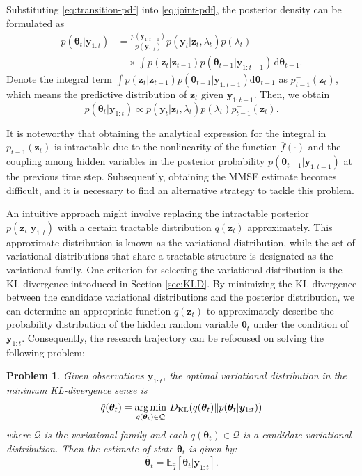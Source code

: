 \documentclass[10pt,twocolumn,twoside]{IEEEtran}
\newtheorem{problem}{Problem}
\newcommand{\argmin}[1]{{\mathop{\arg\min}_{#1}~}}
\newcommand{\E}[2][]{ \mathbb{E}_{#1}\left[#2\right] } %
\newcommand{\fs}{\text{.}} %
\newcommand{\y}{{ \bm{y} }}
\newcommand{\z}{{ \bm{z} }}
\begin{document}
Substituting \eqref{eq:transition-pdf} into \eqref{eq:joint-pdf}, the posterior density can be formulated as
\begin{equation*}
\begin{split}
    p(\bm\theta_t|\y_{1:t}) &= \frac{p(\y_{1:t-1})}{p(\y_{1:t})}p(\y_t|\z_t,\lambda_t)p(\lambda_t)\\
    &\quad\times\int{p(\z_t|\z_{t-1})p(\bm\theta_{t-1}|\y_{1:t-1})}\,\mathrm{d}\bm\theta_{t-1} \fs
\end{split}
\end{equation*}
Denote the integral term $\int{p(\z_t|\z_{t-1})p(\bm\theta_{t-1}|\y_{1:t-1})}\mathrm{d}\bm\theta_{t-1}$ as $p^-_{t-1}(\z_t)$, which means the predictive distribution of $\z_t$ given $\y_{1:t-1}$. Then, we obtain
\begin{equation} \label{eq:posterior}
    p(\bm\theta_t|\y_{1:t}) \propto p(\y_t|\z_t,\lambda_t)p(\lambda_t)p^-_{t-1}(\z_t) \fs
\end{equation}

It is noteworthy that obtaining the analytical expression for the integral in $p^-_{t-1}(\z_t)$ is intractable due to the nonlinearity of the function $\overline{f}(\cdot)$ and the coupling among hidden variables in the posterior probability $p(\bm\theta_{t-1}|\y_{1:t-1})$ at the previous time step. Subsequently, obtaining the MMSE estimate becomes difficult, and it is necessary to find an alternative strategy to tackle this problem.

An intuitive approach might involve replacing the intractable posterior $p(\z_t|\y_{1:t})$ with a certain tractable distribution $q(\z_t)$ approximately. This approximate distribution is known as the variational distribution, while the set of variational distributions that share a tractable structure is designated as the variational family. One criterion for selecting the variational distribution is the KL divergence introduced in Section \ref{sec:KLD}. By minimizing the KL divergence between the candidate variational distributions and the posterior distribution, we can determine an appropriate function $\hat{q}(\z_t)$ to approximately describe the probability distribution of the hidden random variable $\bm\theta_t$ under the condition of $\y_{1:t}$. Consequently, the research trajectory can be refocused on solving the following problem:
\begin{problem} \label{prob:KLD}
Given observations $\y_{1:t}$, the optimal variational distribution in the minimum KL-divergence sense is
\begin{equation*}
    \hat{q}(\bm\theta_t) = \argmin{q(\bm\theta_t)\in\mathcal{Q}}D_{\rm KL}(q(\bm\theta_t)\Vert p(\bm\theta_t|\y_{1:t}))
\end{equation*}
where $\mathcal{Q}$ is the variational family and each $q(\bm\theta_t)\in\mathcal{Q}$ is a candidate variational distribution. Then the estimate of state $\bm\theta_t$ is given by:
\begin{equation*}
    \hat{\bm\theta}_t = \E[\hat{q}]{\bm\theta_t|\y_{1:t}} \fs
\end{equation*}
\end{problem}
\end{document}
